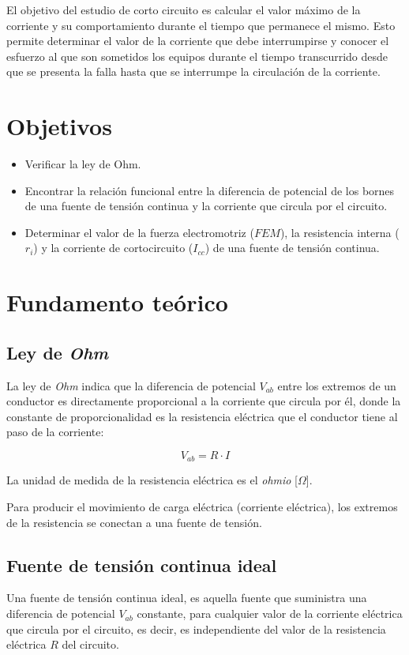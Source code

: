 \documentclass[letter,11pt]{article}
\begin{document}
\begin{enumerate}
El objetivo del estudio de corto circuito es calcular el valor máximo de la
corriente y su comportamiento durante el tiempo que permanece el mismo. Esto
permite determinar el valor de la corriente que debe interrumpirse y conocer el
esfuerzo al que son sometidos los equipos durante el tiempo transcurrido desde
que se presenta la falla hasta que se interrumpe la circulación de la corriente.
\end{enumerate}

\section{Objetivos}
\begin{itemize}
    \item Verificar la ley de Ohm.
    \item Encontrar la relación funcional entre la diferencia de potencial de
        los bornes de una fuente de tensión continua y la corriente que circula
        por el circuito.
    \item Determinar el valor de la fuerza electromotriz ($FEM$), la resistencia
        interna ($r_i$) y la corriente de cortocircuito ($I_{cc}$) de una fuente
        de tensión continua.
\end{itemize}

\section{Fundamento teórico}

\subsection{Ley de \emph{Ohm}}
La ley de \emph{Ohm} indica que la diferencia de potencial $V_{ab}$ entre los
extremos de un conductor es directamente proporcional a la corriente que circula
por él, donde la constante de proporcionalidad es la resistencia eléctrica que
el conductor tiene al paso de la corriente:

\begin{equation}
    V_{ab} = R \cdot I
\label{ohm}
\end{equation}

La unidad de medida de la resistencia eléctrica es el \emph{ohmio} [$\Omega$].

Para producir el movimiento de carga eléctrica (corriente eléctrica), los
extremos de la resistencia se conectan a una fuente de tensión.

\subsection{Fuente de tensión continua ideal}
Una fuente de tensión continua ideal, es aquella fuente que suministra una
diferencia de potencial $V_{ab}$ constante, para cualquier valor de la corriente
eléctrica que circula por el circuito, es decir, es independiente del valor de
la resistencia eléctrica $R$ del circuito.
\end{document}
